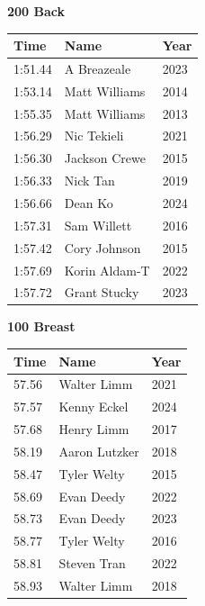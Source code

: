\vspace{1.2em}
\noindent\begin{minipage}[t]{0.48\textwidth}
\centering
\textbf{\textcolor{teamprimary}{200 Back}}\par
\vspace{0.5em}
\centering
\small
\renewcommand{\arraystretch}{1.0}
\setlength{\tabcolsep}{4pt}
\begin{tabular}{@{}p{1.8cm}p{3.0cm}p{1.0cm}@{}}
\toprule
\textbf{Time} & \textbf{Name} & \textbf{Year} \\
\midrule
1:51.44 & A Breazeale & 2023 \\
1:53.14 & Matt Williams & 2014 \\
1:55.35 & Matt Williams & 2013 \\
1:56.29 & Nic Tekieli & 2021 \\
1:56.30 & Jackson Crewe & 2015 \\
1:56.33 & Nick Tan & 2019 \\
1:56.66 & Dean Ko & 2024 \\
1:57.31 & Sam Willett & 2016 \\
1:57.42 & Cory Johnson & 2015 \\
1:57.69 & Korin Aldam-T & 2022 \\
1:57.72 & Grant Stucky & 2023 \\
\bottomrule
\end{tabular}
\end{minipage}
\hfill
\begin{minipage}[t]{0.48\textwidth}
\centering
\textbf{\textcolor{teamprimary}{100 Breast}}\par
\vspace{0.5em}
\centering
\small
\renewcommand{\arraystretch}{1.0}
\setlength{\tabcolsep}{4pt}
\begin{tabular}{@{}p{1.8cm}p{3.0cm}p{1.0cm}@{}}
\toprule
\textbf{Time} & \textbf{Name} & \textbf{Year} \\
\midrule
57.56 & Walter Limm & 2021 \\
57.57 & Kenny Eckel & 2024 \\
57.68 & Henry Limm & 2017 \\
58.19 & Aaron Lutzker & 2018 \\
58.47 & Tyler Welty & 2015 \\
58.69 & Evan Deedy & 2022 \\
58.73 & Evan Deedy & 2023 \\
58.77 & Tyler Welty & 2016 \\
58.81 & Steven Tran & 2022 \\
58.93 & Walter Limm & 2018 \\
\bottomrule
\end{tabular}
\end{minipage}
